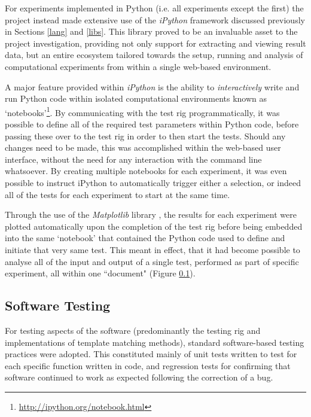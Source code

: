 For experiments implemented in Python (i.e. all experiments except the first) the project instead made extensive use of the \textit{iPython} framework \cite{ipython} discussed previously in Sections \ref{lang} and \ref{libs}. This library proved to be an invaluable asset to the project investigation, providing not only support for extracting and viewing result data, but an entire ecosystem tailored towards the setup, running and analysis of computational experiments from within a single web-based environment. 

A major feature provided within \textit{iPython} is the ability to \textit{interactively} write and run Python code within isolated computational environments known as `notebooks'\footnote{\url{http://ipython.org/notebook.html}}. By communicating with the test rig programmatically, it was possible to define all of the required test parameters within Python code, before passing these over to the test rig in order to then start the tests. Should any changes need to be made, this was accomplished within the web-based user interface, without the need for any interaction with the command line whatsoever. By creating multiple notebooks for each experiment, it was even possible to instruct iPython to automatically trigger either a selection, or indeed all of the tests for each experiment to start at the same time. 

Through the use of the \textit{Matplotlib} library \cite{matplotlib}, the results for each experiment were plotted automatically upon the completion of the test rig before being embedded into the same `notebook' that contained the Python code used to define and initiate that very same test. This meant in effect, that it had become possible to analyse all of the input and output of a single test, performed as part of specific experiment, all within one ``document" (Figure \ref{}).


\subsection{Software Testing}

For testing aspects of the software (predominantly the testing rig and implementations of template matching methods), standard software-based testing practices were adopted. This constituted mainly of unit tests written to test for each specific function written in code, and regression tests for confirming that software continued to work as expected following the correction of a bug.

